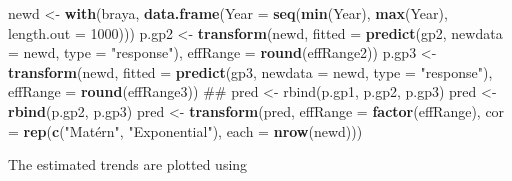\documentclass[12pt,]{article}
\newenvironment{Shaded}{\begin{snugshade}}{\end{snugshade}}
\newcommand{\KeywordTok}[1]{\textcolor[rgb]{0.13,0.29,0.53}{\textbf{{#1}}}}
\newcommand{\DataTypeTok}[1]{\textcolor[rgb]{0.13,0.29,0.53}{{#1}}}
\newcommand{\DecValTok}[1]{\textcolor[rgb]{0.00,0.00,0.81}{{#1}}}
\newcommand{\StringTok}[1]{\textcolor[rgb]{0.31,0.60,0.02}{{#1}}}
\newcommand{\OtherTok}[1]{\textcolor[rgb]{0.56,0.35,0.01}{{#1}}}
\newcommand{\NormalTok}[1]{{#1}}
\begin{document}
\begin{Shaded}
\begin{Highlighting}[]
\NormalTok{newd <-}\StringTok{ }\KeywordTok{with}\NormalTok{(braya, }\KeywordTok{data.frame}\NormalTok{(}\DataTypeTok{Year =} \KeywordTok{seq}\NormalTok{(}\KeywordTok{min}\NormalTok{(Year), }\KeywordTok{max}\NormalTok{(Year),}
                               \DataTypeTok{length.out =} \DecValTok{1000}\NormalTok{)))}
\NormalTok{p.gp2 <-}\StringTok{ }\KeywordTok{transform}\NormalTok{(newd,}
                   \DataTypeTok{fitted =} \KeywordTok{predict}\NormalTok{(gp2, }\DataTypeTok{newdata =} \NormalTok{newd, }\DataTypeTok{type =} \StringTok{"response"}\NormalTok{),}
                   \DataTypeTok{effRange =} \KeywordTok{round}\NormalTok{(effRange2))}
\NormalTok{p.gp3 <-}\StringTok{ }\KeywordTok{transform}\NormalTok{(newd,}
                   \DataTypeTok{fitted =} \KeywordTok{predict}\NormalTok{(gp3, }\DataTypeTok{newdata =} \NormalTok{newd, }\DataTypeTok{type =} \StringTok{"response"}\NormalTok{),}
                   \DataTypeTok{effRange =} \KeywordTok{round}\NormalTok{(effRange3))}
\NormalTok{## pred <- rbind(p.gp1, p.gp2, p.gp3)}
\NormalTok{pred <-}\StringTok{ }\KeywordTok{rbind}\NormalTok{(p.gp2, p.gp3)}
\NormalTok{pred <-}\StringTok{ }\KeywordTok{transform}\NormalTok{(pred, }\DataTypeTok{effRange =} \KeywordTok{factor}\NormalTok{(effRange),}
                  \DataTypeTok{cor =} \KeywordTok{rep}\NormalTok{(}\KeywordTok{c}\NormalTok{(}\StringTok{"Matérn"}\NormalTok{, }\StringTok{"Exponential"}\NormalTok{), }\DataTypeTok{each =} \KeywordTok{nrow}\NormalTok{(newd)))}
\end{Highlighting}
\end{Shaded}

The estimated trends are plotted using

\begin{Shaded}
\end{Shaded}
\end{document}
